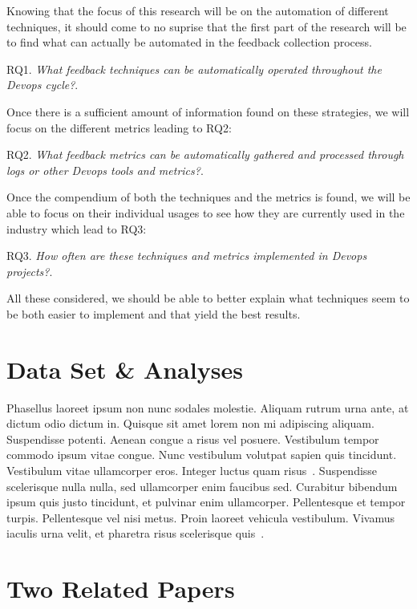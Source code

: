 \documentclass[10pt, conference]{IEEEtran}
\begin{document}
Knowing that the focus of this research will be on the automation of different techniques,
it should come to no suprise that the first part of the research will be to 
find what can actually be automated in the feedback collection process.
\begin{displayquote}
  RQ1. \emph{What feedback techniques can be automatically operated throughout 
  the Devops cycle?}.
\end{displayquote} 
Once there is a sufficient amount of information found on these strategies, we will 
focus on the different metrics leading to RQ2:
\begin{displayquote}
  RQ2. \emph{What feedback metrics can be automatically gathered and processed 
  through logs or other Devops tools and metrics?}.
\end{displayquote} 
Once the compendium of both the techniques and the metrics is found, we 
will be able to focus on their individual usages to see how they are currently 
used in the industry which lead to RQ3:
\begin{displayquote}
  RQ3. \emph{How often are these techniques and metrics implemented in Devops projects?}.
\end{displayquote} 

All these considered, we should be able to better explain what techniques 
seem to be both easier to implement and that yield the best results. 


\section{Data Set \& Analyses}
\label{sec:backgr-relat-work}
Phasellus laoreet ipsum non nunc sodales molestie. Aliquam rutrum urna ante, 
at dictum odio dictum in. Quisque sit amet lorem non mi adipiscing aliquam. 
Suspendisse potenti. Aenean congue a risus vel posuere. Vestibulum tempor 
commodo ipsum vitae congue. Nunc vestibulum volutpat sapien quis tincidunt. 
Vestibulum vitae ullamcorper eros. Integer luctus quam risus~\cite{humble10}. 
Suspendisse scelerisque nulla nulla, sed ullamcorper enim faucibus sed. 
Curabitur bibendum ipsum quis justo tincidunt, et pulvinar enim ullamcorper. 
Pellentesque et tempor turpis. Pellentesque vel nisi metus. Proin laoreet 
vehicula vestibulum. Vivamus iaculis urna velit, et pharetra risus scelerisque quis~\cite{baysal11}.

\section{Two Related Papers}
\label{sec:two-related-papers}
\end{document}
